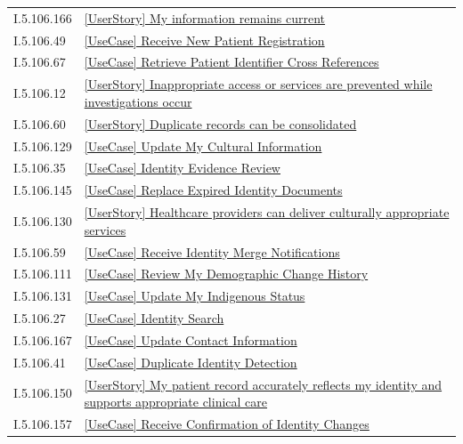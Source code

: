 \begin{longtable}{p{.22\linewidth}p{.73\linewidth}}
I.5.106.166 & \hyperref[element:75b7d6dfe9404a5ea03a1a9d4874cf99]{[UserStory] My information remains current} \\
I.5.106.49 & \hyperref[element:77275e05d86a408a8c4c7cc2a5521574]{[UseCase] Receive New Patient Registration} \\
I.5.106.67 & \hyperref[element:787235cb7d1b4959907e8251e8ce1a46]{[UseCase] Retrieve Patient Identifier Cross References} \\
I.5.106.12 & \hyperref[element:7a64bee1fb6b476f9f96c73273b3a8be]{[UserStory] Inappropriate access or services are prevented while investigations occur} \\
I.5.106.60 & \hyperref[element:7b6c2a70acc849228869f4b67096f831]{[UserStory] Duplicate records can be consolidated} \\
I.5.106.129 & \hyperref[element:7be79de3939249edb7a1dba756f8cbef]{[UseCase] Update My Cultural Information} \\
I.5.106.35 & \hyperref[element:7cdac9e2994a403a8afec2186873c611]{[UseCase] Identity Evidence Review} \\
I.5.106.145 & \hyperref[element:7e06e50d76cd45719e92f5bb037a4134]{[UseCase] Replace Expired Identity Documents} \\
I.5.106.130 & \hyperref[element:813faef097b4486f865a73686f858c71]{[UserStory] Healthcare providers can deliver culturally appropriate services} \\
I.5.106.59 & \hyperref[element:8639e783fd214a06854b8c94bc740c6a]{[UseCase] Receive Identity Merge Notifications} \\
I.5.106.111 & \hyperref[element:86faff9ba38c4d6da7698ed776d485d6]{[UseCase] Review My Demographic Change History} \\
I.5.106.131 & \hyperref[element:8d235c7f8dab49318382eb82b613abec]{[UseCase] Update My Indigenous Status} \\
I.5.106.27 & \hyperref[element:8e9ff7af54e841efba1c3c18a2d97a94]{[UseCase] Identity Search} \\
I.5.106.167 & \hyperref[element:91aa490598e54d6c9f1821ce89a9ee00]{[UseCase] Update Contact Information} \\
I.5.106.41 & \hyperref[element:93404b8df297496c9674df507568a9f9]{[UseCase] Duplicate Identity Detection} \\
I.5.106.150 & \hyperref[element:97cd84a885c14ea5abf2bdef9cda7c9f]{[UserStory] My patient record accurately reflects my identity and supports appropriate clinical care} \\
I.5.106.157 & \hyperref[element:993a17c51231437c8dc2643a392392be]{[UseCase] Receive Confirmation of Identity Changes} \\

\end{longtable}
